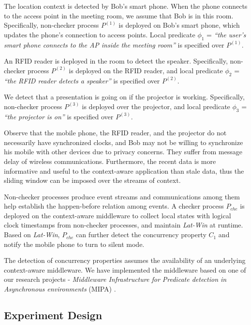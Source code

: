 \documentclass[12pt,journal,letterpaper,compsoc]{IEEEtran}
\begin{document}
The location context is detected by Bob's smart phone. When the phone connects to the access point in the meeting room, we assume that Bob is in this room. Specifically, non-checker process $P^{(1)}$ is deployed on Bob's smart phone, which updates the phone's connection to access points. Local predicate $\phi_{1}$ = {\it``the user's smart phone connects to the AP inside the meeting room''} is specified over $P^{(1)}$.

An RFID reader is deployed in the room to detect the speaker. Specifically, non-checker process $P^{(2)}$ is deployed on the RFID reader, and local predicate $\phi_{2}$ = {\it``the RFID reader detects a speaker''} is specified over $P^{(2)}$.

We detect that a presentation is going on if the projector is working. Specifically, non-checker process $P^{(3)}$ is deployed over the projector, and local predicate $\phi_{3}$ = {\it``the projector is on''} is specified over $P^{(3)}$.

Observe that the mobile phone, the RFID reader, and the projector do not necessarily have synchronized clocks, and Bob may not be willing to synchronize his mobile with other devices due to privacy concerns. They suffer from message delay of wireless communications. Furthermore, the recent data is more informative and useful to the context-aware application than stale data, thus the sliding window can be imposed over the streams of context.

Non-checker processes produce event streams and communications among them help establish the happen-before relation among events. A checker process $P_{che}$ is deployed on the context-aware middleware to collect local states with logical clock timestamps from non-checker processes, and maintain {\it Lat-Win} at runtime. Based on {\it Lat-Win}, $P_{che}$ can further detect the concurrency property $C_{1}$ \cite{Huang11} and notify the mobile phone to turn to silent mode.

The detection of concurrency properties assumes the availability of an underlying context-aware middleware. We have implemented the middleware based on one of our research projects - {\it Middleware Infrastructure for Predicate detection in Asynchronous environments} (MIPA) \cite{MIPA, Huang10b, Huang11}.

\subsection{Experiment Design}
\end{document}
